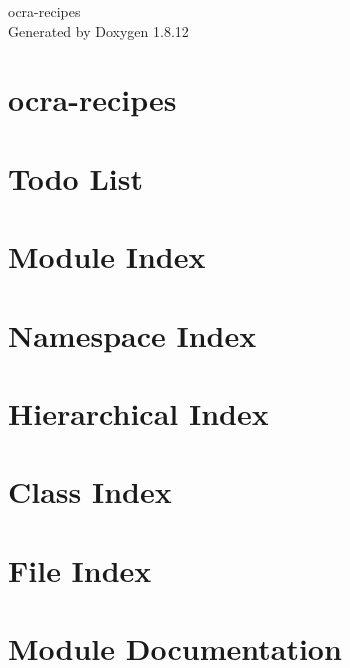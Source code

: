 \documentclass[twoside]{book}
\newcommand{\+}{\discretionary{\mbox{\scriptsize$\hookleftarrow$}}{}{}}
\newcommand{\clearemptydoublepage}{%
  \newpage{\pagestyle{empty}\cleardoublepage}%
}
\begin{document}
\hypersetup{pageanchor=false,
             bookmarksnumbered=true,
             pdfencoding=unicode
            }
\begin{titlepage}
\vspace*{7cm}
\begin{center}%
{\Large ocra-\/recipes }\\
\vspace*{1cm}
{\large Generated by Doxygen 1.8.12}\\
\end{center}
\end{titlepage}
\clearemptydoublepage
{}
\tableofcontents
\clearemptydoublepage
{}
\hypersetup{pageanchor=true}

\chapter{ocra-\/recipes}
\label{index}\hypertarget{index}{}
\chapter{Todo List}
\label{todo}
\hypertarget{todo}{}

\chapter{Module Index}

\chapter{Namespace Index}

\chapter{Hierarchical Index}

\chapter{Class Index}

\chapter{File Index}

\chapter{Module Documentation}





\end{document}
